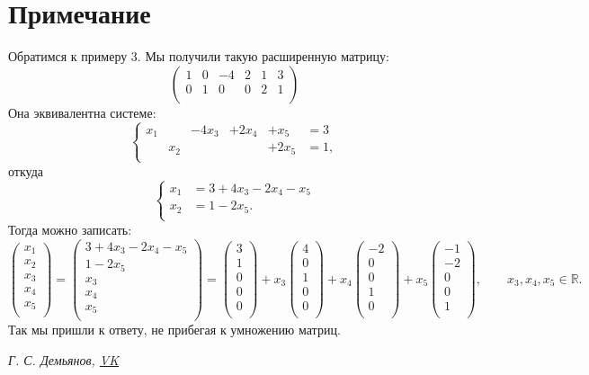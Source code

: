 \documentclass[a4paper,12pt]{article}
\begin{document}
\section{Примечание}
Обратимся к примеру 3. Мы получили такую расширенную матрицу:
$$
\left( \begin{array}{ccccc|c}
1 & 0 & -4 & 2 & 1 & 3\\
0 & 1 & 0 & 0 & 2 & 1\\
\end{array} \right)
$$
Она эквивалентна системе:
$$
\left\{
\begin{array}{rrrrrrl}
x_1&&-4x_3&+2x_4&+x_5&=3\\
&x_2&&&+2x_5&=1,\\
\end{array}
\right.
$$
откуда
$$
\left\{
\begin{array}{rl}
x_1&=3+4x_3-2x_4-x_5\\
x_2&=1-2x_5.\\
\end{array}
\right.
$$
Тогда можно записать:
$$
\begin{pmatrix}
x_1\\
x_2\\
x_3\\
x_4\\
x_5\\
\end{pmatrix}
=
\begin{pmatrix}
3+4x_3-2x_4-x_5\\
1-2x_5\\
x_3\\
x_4\\
x_5\\
\end{pmatrix}
=
\begin{pmatrix}
3\\
1\\
0\\
0\\
0\\
\end{pmatrix}
+x_3
\begin{pmatrix}
4\\
0\\
1\\
0\\
0\\
\end{pmatrix}
+x_4
\begin{pmatrix}
-2\\
0\\
0\\
1\\
0\\
\end{pmatrix}
+x_5
\begin{pmatrix}
-1\\
-2\\
0\\
0\\
1\\
\end{pmatrix}
,\qquad x_3, x_4, x_5 \in \mathbb{R}.
$$
Так мы пришли к ответу, не прибегая к умножению матриц.











\begin{center}
	\vfill \emph{{\small Г. С. Демьянов, \href{https://vk.com/id37346992}{VK}}}
\end{center}
\end{document}
